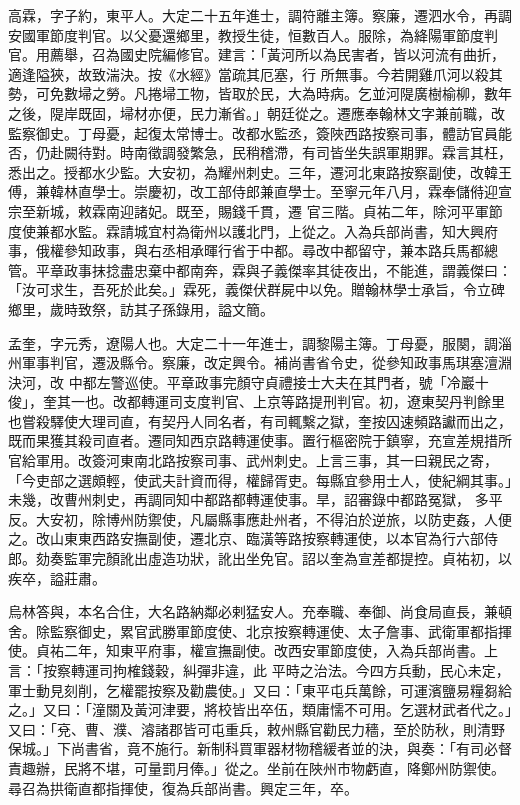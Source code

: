 \begin{pinyinscope}
 高霖，字子約，東平人。大定二十五年進士，調符離主簿。察廉，遷泗水令，再調安國軍節度判官。以父憂還鄉里，教授生徒，恒數百人。服除，為絳陽軍節度判官。用薦舉，召為國史院編修官。建言：「黃河所以為民害者，皆以河流有曲折，適逢隘狹，故致湍決。按《水經》當疏其厄塞，行
 所無事。今若開雞爪河以殺其勢，可免數埽之勞。凡捲埽工物，皆取於民，大為時病。乞並河隄廣樹榆柳，數年之後，隄岸既固，埽材亦便，民力漸省。」朝廷從之。遷應奉翰林文字兼前職，改監察御史。丁母憂，起復太常博士。改都水監丞，簽陜西路按察司事，體訪官員能否，仍赴闕待對。時南徵調發繁急，民稍稽滯，有司皆坐失誤軍期罪。霖言其枉，悉出之。授都水少監。大安初，為耀州刺史。三年，遷河北東路按察副使，改韓王傅，兼韓林直學士。崇慶初，改工部侍郎兼直學士。至寧元年八月，霖奉儲偫迎宣宗至新城，敕霖南迎諸妃。既至，賜錢千貫，遷
 官三階。貞祐二年，除河平軍節度使兼都水監。霖請城宜村為衛州以護北門，上從之。入為兵部尚書，知大興府事，俄權參知政事，與右丞相承暉行省于中都。尋改中都留守，兼本路兵馬都總管。平章政事抹捻盡忠棄中都南奔，霖與子義傑率其徒夜出，不能進，謂義傑曰：「汝可求生，吾死於此矣。」霖死，義傑伏群屍中以免。贈翰林學士承旨，令立碑鄉里，歲時致祭，訪其子孫錄用，謚文簡。



 孟奎，字元秀，遼陽人也。大定二十一年進士，調黎陽主簿。丁母憂，服闋，調淄州軍事判官，遷汲縣令。察廉，改定興令。補尚書省令史，從參知政事馬琪塞澶淵決河，改
 中都左警巡使。平章政事完顏守貞禮接士大夫在其門者，號「冷巖十俊」，奎其一也。改都轉運司支度判官、上京等路提刑判官。初，遼東契丹判餘里也嘗殺驛使大理司直，有契丹人同名者，有司輒繫之獄，奎按囚速頻路讞而出之，既而果獲其殺司直者。遷同知西京路轉運使事。置行樞密院于鎮寧，充宣差規措所官給軍用。改簽河東南北路按察司事、武州刺史。上言三事，其一曰親民之寄，「今吏部之選頗輕，使武夫計資而得，權歸胥吏。每縣宜參用士人，使紀綱其事。」未幾，改曹州刺史，再調同知中都路都轉運使事。旱，詔審錄中都路冤獄，
 多平反。大安初，除博州防禦使，凡屬縣事應赴州者，不得泊於逆旅，以防吏姦，人便之。改山東東西路安撫副使，遷北京、臨潢等路按察轉運使，以本官為行六部侍郎。劾奏監軍完顏訛出虛造功狀，訛出坐免官。詔以奎為宣差都提控。貞祐初，以疾卒，謚莊肅。



 烏林答與，本名合住，大名路納鄰必剌猛安人。充奉職、奉御、尚食局直長，兼頓舍。除監察御史，累官武勝軍節度使、北京按察轉運使、太子詹事、武衛軍都指揮使。貞祐二年，知東平府事，權宣撫副使。改西安軍節度使，入為兵部尚書。上言：「按察轉運司拘榷錢穀，糾彈非違，此
 平時之治法。今四方兵動，民心未定，軍士動見刻削，乞權罷按察及勸農使。」又曰：「東平屯兵萬餘，可運濱鹽易糧芻給之。」又曰：「潼關及黃河津要，將校皆出卒伍，類庸懦不可用。乞選材武者代之。」又曰：「兗、曹、濮、濬諸郡皆可屯重兵，敕州縣官勸民力穡，至於防秋，則清野保城。」下尚書省，竟不施行。新制科買軍器材物稽緩者並的決，與奏：「有司必督責趣辦，民將不堪，可量罰月俸。」從之。坐前在陜州市物虧直，降鄭州防禦使。尋召為拱衛直都指揮使，復為兵部尚書。興定三年，卒。




\end{pinyinscope}
